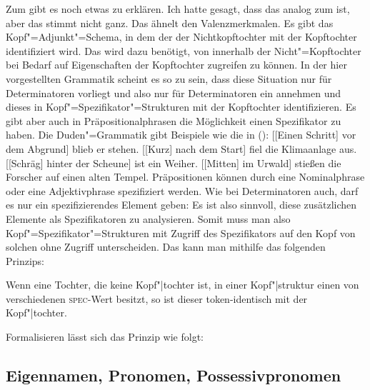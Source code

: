 \noindent
Zum \specw gibt es noch etwas zu erklären. Ich hatte gesagt, dass das \specm analog zum \modm ist,
aber das stimmt nicht ganz. Das \modm ähnelt den Valenzmerkmalen. Es gibt das Kopf"=Adjunkt"=Schema,
in dem der \modw der Nichtkopftochter mit der Kopftochter identifiziert wird. Das \specm wird dazu
benötigt, von innerhalb der Nicht"=Kopftochter bei Bedarf auf Eigenschaften der Kopftochter
zugreifen zu können. In der hier vorgestellten Grammatik scheint es so zu sein, dass diese Situation nur
für Determinatoren vorliegt und also nur für Determinatoren ein \specm annehmen und dieses in
Kopf"=Spezifikator"=Strukturen mit der Kopftochter identifizieren. Es gibt aber auch in
Präpositionalphrasen die Möglichkeit einen Spezifikator zu haben. Die Duden"=Grammatik \citeyearpar[\S 1300]{Duden2005} gibt Beispiele wie die in ():
\eal
\ex {}[[Einen Schritt] vor dem Abgrund] blieb er stehen.\label{Beispiel-Schritt-vor-dem-Abgrund}
\ex {}[[Kurz] nach dem Start] fiel die Klimaanlage aus.
\ex {}[[Schräg] hinter der Scheune] ist ein Weiher.
\ex {}[[Mitten] im Urwald] stießen die Forscher auf einen alten Tempel.
\zl
Präpositionen können durch eine Nominalphrase oder eine Adjektivphrase spezifiziert werden. Wie bei
Determinatoren auch, darf es nur ein spezifizierendes Element geben:
\eal
{}
\zl
Es ist also sinnvoll, diese zusätzlichen Elemente als Spezifikatoren zu analysieren.
Somit muss man also Kopf"=Spezifikator"=Strukturen mit Zugriff des Spezifikators auf den Kopf von
solchen ohne Zugriff unterscheiden. Das kann man mithilfe das folgenden Prinzips:

\begin{prinzip-break} 
\label{prinzip-spec}
Wenn eine Tochter, die keine Kopf"|tochter ist, in einer Kopf"|struktur
einen von  verschiedenen \textsc{spec}-Wert besitzt, so ist dieser token-identisch mit
der Kopf"|tochter.
\end{prinzip-break}
Formalisieren lässt sich das Prinzip wie folgt:
\ea
{} \impl
{}
\z



\subsection{Eigennamen, Pronomen, Possessivpronomen}

